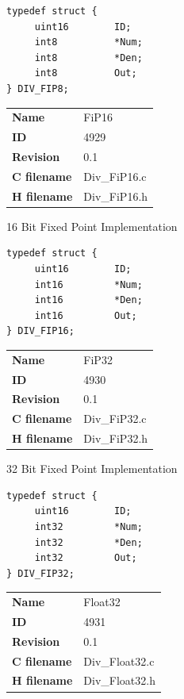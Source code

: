 \begin{lstlisting}
typedef struct {
     uint16        ID;
     int8          *Num;
     int8          *Den;
     int8          Out;
} DIV_FIP8;
\end{lstlisting}

\ifdefined \AddTestReports
{}
\fi
{}
\nopagebreak[0]
\begin{tabular}{l l}
\textbf{Name} & FiP16 \tabularnewline
\textbf{ID} & 4929 \tabularnewline
\textbf{Revision} & 0.1 \tabularnewline
\textbf{C filename} & Div\_FiP16.c \tabularnewline
\textbf{H filename} & Div\_FiP16.h \tabularnewline
\end{tabular}
\vspace{1ex}

16 Bit Fixed Point Implementation

\begin{lstlisting}
typedef struct {
     uint16        ID;
     int16         *Num;
     int16         *Den;
     int16         Out;
} DIV_FIP16;
\end{lstlisting}

\ifdefined \AddTestReports
{}
\fi
{}
\nopagebreak[0]
\begin{tabular}{l l}
\textbf{Name} & FiP32 \tabularnewline
\textbf{ID} & 4930 \tabularnewline
\textbf{Revision} & 0.1 \tabularnewline
\textbf{C filename} & Div\_FiP32.c \tabularnewline
\textbf{H filename} & Div\_FiP32.h \tabularnewline
\end{tabular}
\vspace{1ex}

32 Bit Fixed Point Implementation

\begin{lstlisting}
typedef struct {
     uint16        ID;
     int32         *Num;
     int32         *Den;
     int32         Out;
} DIV_FIP32;
\end{lstlisting}

\ifdefined \AddTestReports
{}
\fi
{}
\nopagebreak[0]
\begin{tabular}{l l}
\textbf{Name} & Float32 \tabularnewline
\textbf{ID} & 4931 \tabularnewline
\textbf{Revision} & 0.1 \tabularnewline
\textbf{C filename} & Div\_Float32.c \tabularnewline
\textbf{H filename} & Div\_Float32.h \tabularnewline
\end{tabular}
\vspace{1ex}

